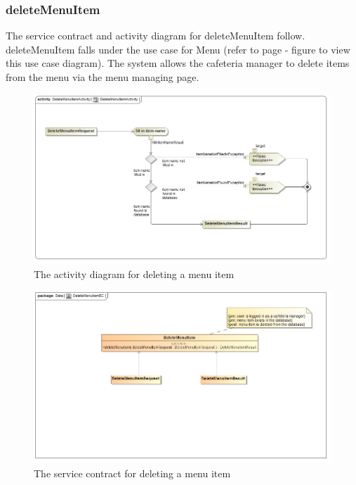 \documentclass[a4paper,12pt]{article}
\begin{document}
 \subsubsection{deleteMenuItem}
The service contract and activity diagram for deleteMenuItem follow. deleteMenuItem falls under the use case for Menu (refer to page   - figure   to view this use case diagram). The system allows the cafeteria manager to delete items from the menu via the menu managing page.
\begin{figure}[H]
  \centering
    \includegraphics[width=1.0\textwidth]{../images/DeleteMenuItemActivity.jpg}
    \caption{The activity diagram for deleting a menu item } 
\end{figure}
\begin{figure}[H]
	\centering
	\includegraphics[width=1.0\textwidth]{../images/DeleteMenuItemSC.jpg}
	\caption{The service contract for deleting a menu item}
\end{figure}
\end{document}
